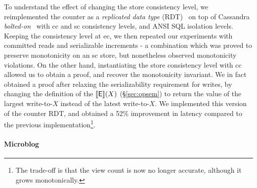 To understand the effect of changing the store consistency level, we
reimplemented the counter as a \emph{replicated data type}
(RDT)~\cite{crdt,burckhardt14} on top of Cassandra
\emph{bolted-on}~\cite{bailisbolton} with {\sc cc} and {\sc sc}
consistency levels, and ANSI SQL isolation levels. Keeping the
consistency level at {\sc ec}, we then repeated our experiments with
committed reads and serializable increments - a combination which was
proved to preserve monotonicity on an {\sc sc} store, but nonetheless
observed monotonicity violations. On the other hand, instantiating the
store consistency level with {\sc cc} allowed us to obtain a proof, and
recover the monotonicity invariant. We in fact obtained a proof after
relaxing the serializability requirement for writes, by changing the
definition of the $\llbracket \textsf{E} \rrbracket(X)$ (\S\ref{sec:opsem}) to return the
value of the largest write-to-$X$ instead of the latest write-to-$X$.
We implemented this version of the counter RDT, and obtained a 52\%
improvement in latency compared to the previous
implementation\footnote{The trade-off is that the view count is now no
longer accurate, although it grows monotonically.}.

\paragraph{Microblog}

